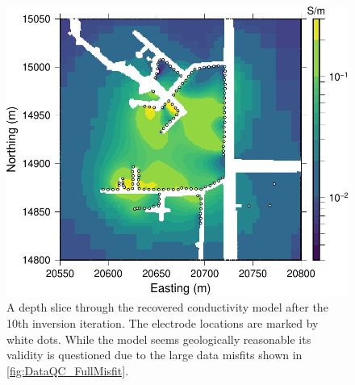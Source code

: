 \documentclass[final,authoryear,5p,times,twocolumn]{elsarticle}
\begin{document}
\begin{figure} [!ht]
    \begin{center}
    \includegraphics[trim=0cm 0cm 0cm 0cm, clip=true,width=0.95\linewidth]{./Figures/Fig3.pdf}
    \end{center}
\caption{A depth slice through the recovered conductivity model after the 10th inversion iteration. The electrode locations are marked by white dots. While the model seems geologically reasonable its validity is questioned due to the large data misfits shown in \ref{fig:DataQC_FullMisfit}.} 
\label{fig:DataQC_FullInvResult}
\end{figure}
\end{document}

